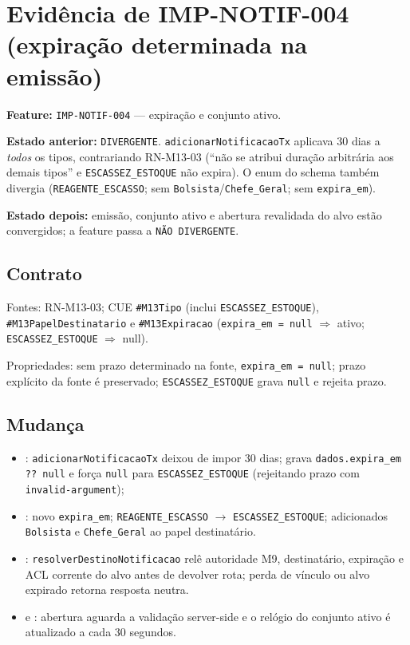 \section{Evidência de IMP-NOTIF-004 (expiração determinada na emissão)}

\textbf{Feature:} \texttt{IMP-NOTIF-004} --- expiração e conjunto ativo.

\textbf{Estado anterior:} \texttt{DIVERGENTE}. \texttt{adicionarNotificacaoTx}
aplicava 30 dias a \emph{todos} os tipos, contrariando RN-M13-03 (``não se
atribui duração arbitrária aos demais tipos'' e \texttt{ESCASSEZ\_ESTOQUE} não
expira). O enum do schema também divergia (\texttt{REAGENTE\_ESCASSO}; sem
\texttt{Bolsista}/\texttt{Chefe\_Geral}; sem \texttt{expira\_em}).

\textbf{Estado depois:} emissão, conjunto ativo e abertura revalidada do alvo
estão convergidos; a feature passa a \texttt{NÃO DIVERGENTE}.

\subsection{Contrato}

Fontes: RN-M13-03; CUE \texttt{\#M13Tipo} (inclui \texttt{ESCASSEZ\_ESTOQUE}),
\texttt{\#M13PapelDestinatario} e \texttt{\#M13Expiracao}
(\texttt{expira\_em = null} $\Rightarrow$ ativo; \texttt{ESCASSEZ\_ESTOQUE}
$\Rightarrow$ null).

Propriedades: sem prazo determinado na fonte, \texttt{expira\_em = null};
prazo explícito da fonte é preservado; \texttt{ESCASSEZ\_ESTOQUE} grava
\texttt{null} e rejeita prazo.

\subsection{Mudança}

\begin{itemize}
  \item {}: \texttt{adicionarNotificacaoTx}
  deixou de impor 30 dias; grava \texttt{dados.expira\_em ?? null} e força
  \texttt{null} para \texttt{ESCASSEZ\_ESTOQUE} (rejeitando prazo com
  \texttt{invalid-argument});
  \item {}: novo
  \texttt{expira\_em}; \texttt{REAGENTE\_ESCASSO} $\rightarrow$
  \texttt{ESCASSEZ\_ESTOQUE}; adicionados \texttt{Bolsista} e
  \texttt{Chefe\_Geral} ao papel destinatário.
  \item {}: \texttt{resolverDestinoNotificacao}
  relê autoridade M9, destinatário, expiração e ACL corrente do alvo antes de
  devolver rota; perda de vínculo ou alvo expirado retorna resposta neutra.
  \item {} e
  : abertura aguarda a validação
  server-side e o relógio do conjunto ativo é atualizado a cada 30 segundos.
\end{itemize}

